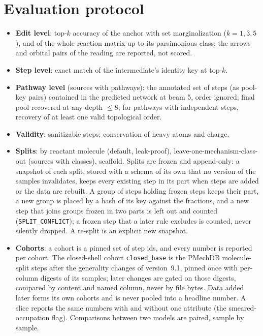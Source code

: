 \documentclass[11pt,a4paper]{article}
\begin{document}
\section{Evaluation protocol}
\label{sec:eval}
\begin{itemize}[nosep]
\item \textbf{Edit level}: top-$k$ accuracy of the anchor with set marginalization ($k=1,3,5$), and of the whole reaction matrix up to its parsimonious class; the arrows and orbital pairs of the reading are reported, not scored.
\item \textbf{Step level}: exact match of the intermediate's identity key at top-$k$.
\item \textbf{Pathway level} (sources with pathways): the annotated set of steps (as pool-key pairs) contained in the predicted network at beam 5, order ignored; final pool recovered at any depth $\le8$; for pathways with independent steps, recovery of at least one valid topological order.
\item \textbf{Validity}: sanitizable steps; conservation of heavy atoms and charge.
\item \textbf{Splits}: by reactant molecule (default, leak-proof), leave-one-mechanism-class-out (sources with classes), scaffold. Splits are frozen and append-only: a snapshot of each split, stored with a schema of its own that no version of the samples invalidates, keeps every existing step in its part when steps are added or the data are rebuilt. A group of steps holding frozen steps keeps their part, a new group is placed by a hash of its key against the fractions, and a new step that joins groups frozen in two parts is left out and counted (\texttt{SPLIT\_CONFLICT}); a frozen step that a later rule excludes is counted, never silently dropped. A re-split is an explicit new snapshot.
\item \textbf{Cohorts}: a cohort is a pinned set of step ids, and every number is reported per cohort. The closed-shell cohort \texttt{closed\_base} is the PMechDB molecule-split steps after the generality changes of version~9.1, pinned once with per-column digests of its samples; later changes are gated on those digests, compared by content and named column, never by file bytes. Data added later forms its own cohorts and is never pooled into a headline number. A slice reports the same numbers with and without one attribute (the smeared-occupation flag). Comparisons between two models are paired, sample by sample.

\end{itemize}
\end{document}
